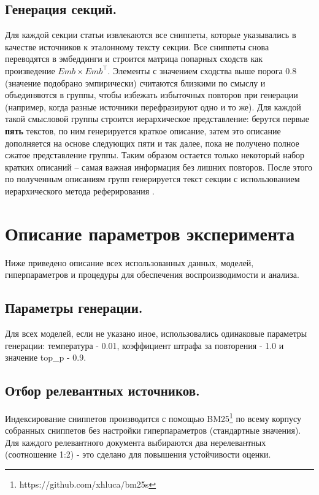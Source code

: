 \documentclass{article}
\begin{document}
\subsection*{Генерация секций.}
Для каждой секции статьи извлекаются все сниппеты, которые указывались в качестве источников к эталонному тексту секции. 
Все сниппеты снова переводятся в эмбеддинги и строится матрица попарных сходств как произведение \(Emb \times Emb^\top\).
Элементы с значением сходства выше порога 0.8 (значение подобрано эмпирически) считаются близкими по смыслу и объединяются в группы, 
чтобы избежать избыточных повторов при генерации (например, когда разные источники перефразируют одно и то же). 
Для каждой такой смысловой группы строится иерархическое представление: 
берутся первые \textbf{пять} текстов, по ним генерируется краткое описание, затем это описание дополняется на основе следующих пяти и так далее, пока не получено полное сжатое представление группы.
Таким образом остается только некоторый набор кратких описаний – самая важная информация без лишних повторов.
После этого по полученным описаниям групп генерируется текст секции с использованием иерархического метода реферирования \cite{hier}.

\section*{Описание параметров эксперимента}
Ниже приведено описание всех использованных данных, моделей, гиперпараметров и процедуры для обеспечения воспроизводимости и анализа.

\subsection*{Параметры генерации.}
Для всех моделей, если не указано иное, использовались одинаковые параметры генерации: температура - 0.01, коэффициент штрафа за повторения - 1.0 и значение top\_p - 0.9.

\subsection*{Отбор релевантных источников.}
Индексирование сниппетов производится с помощью BM25\footnote{https://github.com/xhluca/bm25s} по всему корпусу собранных сниппетов без настройки гиперпараметров (стандартные значения).
Для каждого релевантного документа выбираются два нерелевантных (соотношение 1:2) - это сделано для повышения устойчивости оценки.
\end{document}

